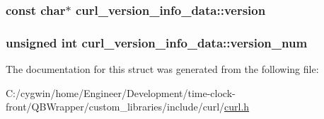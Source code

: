 \subsubsection[{version}]{\setlength{\rightskip}{0pt plus 5cm}const char$\ast$ curl\+\_\+version\+\_\+info\+\_\+data\+::version}\label{structcurl__version__info__data_aaa34d7e958e6f35cde0a03380e12c201}
\hypertarget{structcurl__version__info__data_a4afdf4d9449422e8741959683dd47985}{}
\subsubsection[{version\+\_\+num}]{\setlength{\rightskip}{0pt plus 5cm}unsigned int curl\+\_\+version\+\_\+info\+\_\+data\+::version\+\_\+num}\label{structcurl__version__info__data_a4afdf4d9449422e8741959683dd47985}


The documentation for this struct was generated from the following file\+:\begin{DoxyCompactItemize}
\item 
C\+:/cygwin/home/\+Engineer/\+Development/time-\/clock-\/front/\+Q\+B\+Wrapper/custom\+\_\+libraries/include/curl/\hyperlink{curl_8h}{curl.\+h}\end{DoxyCompactItemize}
